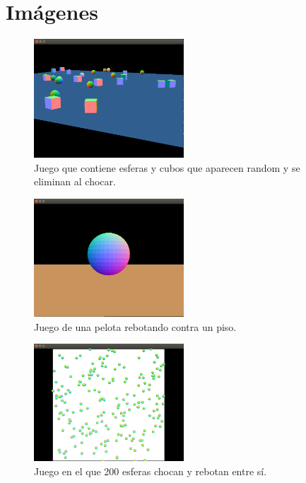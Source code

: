 
\chapter{Imágenes}

\ifpdf
    \graphicspath{{extraimg/Figs/Raster/}{extraimg/Figs/PDF/}{extraimg/Figs/}}
\else
    \graphicspath{{extraimg/Figs/Vector/}{extraimg/Figs/}}
\fi

\begin{figure}[!htbp!]
\centering
\includegraphics[width=0.5\textwidth]{test1}
\caption[Programa de prueba 1]{Juego que contiene esferas y cubos que aparecen random y se eliminan al chocar.}
\label{fig:test1}
\end{figure}

\begin{figure}[!htbp!]
\centering
\includegraphics[width=0.5\textwidth]{test2}
\caption[Programa de prueba 2]{Juego de una pelota rebotando contra un piso.}
\label{fig:test2}
\end{figure}

\begin{figure}[!htbp!]
\centering
\includegraphics[width=0.5\textwidth]{test3}
\caption[Programa de prueba 3]{Juego en el que 200 esferas chocan y rebotan entre sí.}
\label{fig:test3}
\end{figure}

